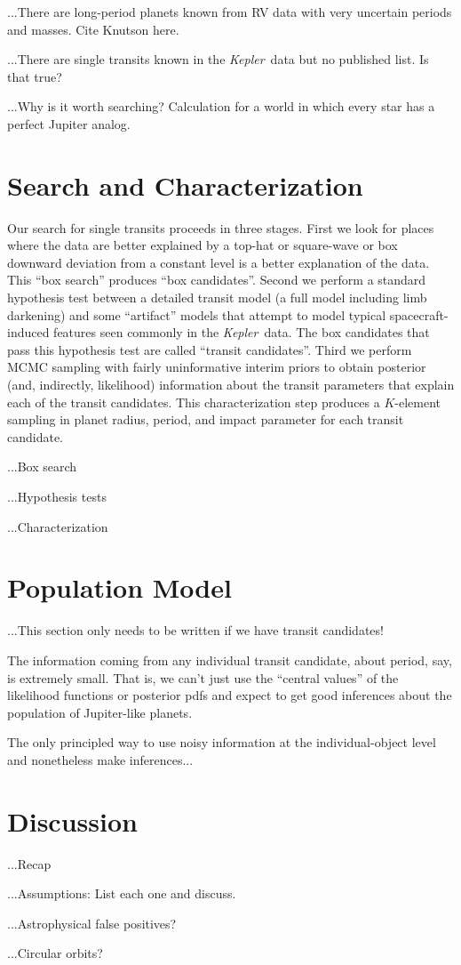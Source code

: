 \documentclass[12pt, preprint]{aastex}
\newcommand{\project}[1]{\textsl{#1}}
\newcommand{\Kepler}{\project{Kepler}}
\begin{document}
...There are long-period planets known from RV data with very
uncertain periods and masses.  Cite Knutson here.

...There are single transits known in the \Kepler\ data but no
published list.  Is that true?

...Why is it worth searching?  Calculation for a world in which every
star has a perfect Jupiter analog.

\section{Search and Characterization}

Our search for single transits proceeds in three stages.
First we look for places where the data are better explained by a
top-hat or square-wave or box downward deviation from a constant level
is a better explanation of the data.
This ``box search'' produces ``box candidates''.
Second we perform a standard hypothesis test between a detailed
transit model (a full model including limb darkening) and some
``artifact'' models that attempt to model typical spacecraft-induced
features seen commonly in the \Kepler\ data.
The box candidates that pass this hypothesis test are called ``transit
candidates''.
Third we perform MCMC sampling with fairly uninformative interim
priors to obtain posterior (and, indirectly, likelihood) information
about the transit parameters that explain each of the transit
candidates.
This characterization step produces a $K$-element sampling in planet
radius, period, and impact parameter for each transit candidate.

...Box search

...Hypothesis tests

...Characterization

\section{Population Model}

...This section only needs to be written if we have transit
candidates!

The information coming from any individual transit candidate, about
period, say, is extremely small.
That is, we can't just use the ``central values'' of the likelihood
functions or posterior pdfs and expect to get good inferences about
the population of Jupiter-like planets.

The only principled way to use noisy information at the
individual-object level and nonetheless make inferences...

\section{Discussion}

...Recap

...Assumptions:  List each one and discuss.

...Astrophysical false positives?

...Circular orbits?
\end{document}

